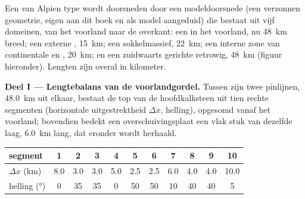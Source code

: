 \begin{problem}\label{pb:b2:alpine-orogen:1}
Een  van Alpien type wordt doorsneden door een modeldoorsnede (een verzonnen geometrie, eigen aan dit boek en
als model aangeduid) die bestaat uit vijf domeinen, van het voorland naar de overkant:
een  in het voorland, nu \qty{48}{km} breed; een externe , \qty{15}{km};
een sokkelmassief, \qty{22}{km}; een interne zone van continentale  en ,
\qty{20}{km}; en een zuidwaarts gerichte retrowig, \qty{48}{km}
(figuur hieronder). Lengten zijn overal in kilometer.

\begin{omfigure}
\centering
{}
\par{}
\end{omfigure}

\noindent\textbf{Deel I --- Lengtebalans van de voorlandgordel.} Tussen zijn twee
pinlijnen, \qty{48.0}{km} uit elkaar, bestaat de top van de hoofdkalksteen uit tien rechte segmenten
(horizontale uitgestrektheid $\Delta x$, helling), opgesomd vanaf het voorland; bovendien bedekt een overschuivingsplaat
een vlak stuk van dezelfde laag, \qty{6.0}{km} lang, dat eronder wordt herhaald.

\smallskip
\begin{center}\small
\begin{tabular}{l|cccccccccc}
segment & 1 & 2 & 3 & 4 & 5 & 6 & 7 & 8 & 9 & 10\\ \hline
$\Delta x$ (\unit{km}) & 8.0 & 3.0 & 3.0 & 5.0 & 2.5 & 2.5 & 6.0 & 4.0 & 4.0 & 10.0\\
helling (\unit{\degree}) & 0 & 35 & 35 & 0 & 50 & 50 & 10 & 40 & 40 & 5
\end{tabular}
\end{center}
\smallskip


\end{problem}
